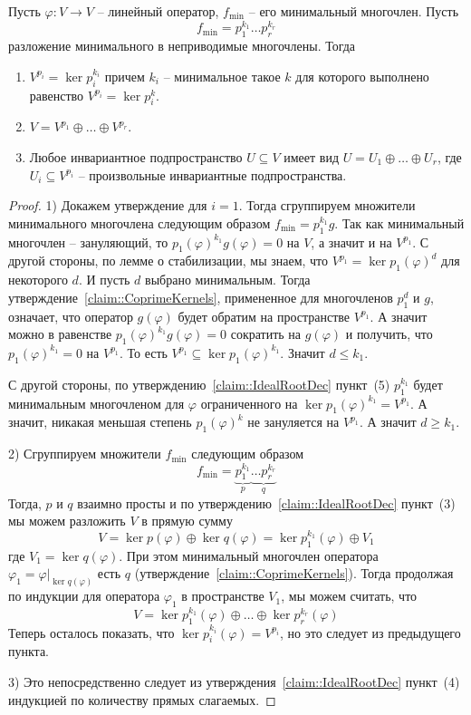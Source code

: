 \begin{claim}\label{claim::GenRootDec}
Пусть $\varphi\colon V\to V$ -- линейный оператор, $f_\text{min}$ -- его минимальный многочлен. Пусть
\[
f_\text{min} = p_1^{k_1} \ldots p_r^{k_r}
\]
разложение минимального в неприводимые многочлены. Тогда
\begin{enumerate}
\item  $V^{p_i} = \ker p_i^{k_i}$ причем $k_i$ -- минимальное такое $k$ для которого выполнено равенство $V^{p_i} = \ker p_i^{k}$.

\item $V = V^{p_1}\oplus \ldots \oplus V^{p_r}$.

\item Любое инвариантное подпространство $U\subseteq V$ имеет вид $U = U_1\oplus \ldots \oplus U_r$, где $U_i \subseteq V^{p_i}$ -- произвольные инвариантные подпространства.
\end{enumerate}
\end{claim}
\begin{proof}
1) Докажем утверждение для $i = 1$. Тогда сгруппируем множители минимального многочлена следующим образом $f_\text{min} = p_1^{k_1} g$. Так как минимальный многочлен -- зануляющий, то $p_1(\varphi)^{k_1}g(\varphi) = 0$ на $V$, а значит и на $V^{p_1}$. С другой стороны, по лемме о стабилизации, мы знаем, что $V^{p_1} = \ker p_1(\varphi)^{d}$ для некоторого $d$. И пусть $d$ выбрано минимальным. Тогда утверждение~\ref{claim::CoprimeKernels}, примененное для многочленов $p_1^d$ и $g$, означает, что оператор $g(\varphi)$ будет обратим на пространстве $V^{p_1}$. А значит можно в равенстве $p_1(\varphi)^{k_1}g(\varphi) = 0$  сократить на $g(\varphi)$ и получить, что $p_1(\varphi)^{k_1} = 0$ на $V^{p_1}$. То есть $V^{p_1}\subseteq \ker p_1(\varphi)^{k_1}$. Значит $d \leqslant k_1$.

С другой стороны, по утверждению~\ref{claim::IdealRootDec} пункт~(5) $p_1^{k_1}$ будет минимальным многочленом для $\varphi$ ограниченного на $\ker p_1(\varphi)^{k_1} = V^{p_1}$. А значит, никакая меньшая степень $p_1(\varphi)^k$ не зануляется на $V^{p_1}$. А значит $d \geqslant k_1$.

2) Сгруппируем множители $f_\text{min}$ следующим образом
\[
f_\text{min} = \underbrace{p_1^{k_1}}_{p}\underbrace{\ldots p_r^{k_r}}_{q}
\]
Тогда, $p$ и $q$ взаимно просты и по утверждению~\ref{claim::IdealRootDec} пункт~(3) мы можем разложить $V$ в прямую сумму 
\[
V = \ker p(\varphi) \oplus \ker q(\varphi) = \ker p_1^{k_1}(\varphi) \oplus V_1
\]
где $V_1 = \ker q(\varphi)$. При этом минимальный многочлен оператора $\varphi_1 = \varphi|_{\ker q(\varphi)}$ есть $q$ (утверждение~\ref{claim::CoprimeKernels}). Тогда продолжая по индукции для оператора $\varphi_1$ в пространстве $V_1$, мы можем считать, что
\[
V = \ker p_1^{k_1}(\varphi)\oplus \ldots \oplus \ker p_r^{k_r}(\varphi)
\]
Теперь осталось показать, что $\ker p_i^{k_i}(\varphi) =  V^{p_i}$, но это следует из предыдущего пункта.

3) Это непосредственно следует из утверждения~\ref{claim::IdealRootDec} пункт~(4) индукцией по количеству прямых слагаемых.
\end{proof}




